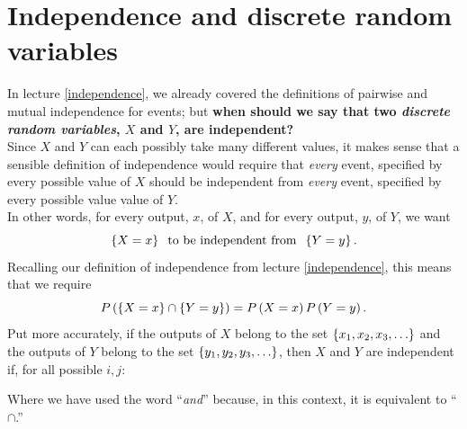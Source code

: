 \section{Independence and discrete random variables} \label{indep(discreterand)}
In lecture \ref{independence}, we already covered the definitions of pairwise and mutual independence for events; but \textbf{when should we say that two \textit{discrete random variables}, $X$ and $Y$, are independent?} \\

\noindent Since $X$ and $Y$ can each possibly take many different values, it makes sense that a sensible definition of independence would require that \textit{every} event, specified by every possible value of $X$ should be independent from \textit{every} event, specified by every possible value value of $Y$. \\

\noindent In other words, for every output, $x$, of $X$, and for every output, $y$, of $Y$, we want
\[
\left\{X = x\right\} \;\; \text{to be independent from} \;\; \left\{Y = y\right\}.
\]
Recalling our definition of independence from lecture \ref{independence}, this means that we require
\[
P\left(\left\{X = x\right\} \cap \left\{Y = y\right\}\right) = P\left(X = x\right)P\left(Y = y\right).
\]
Put more accurately, if the outputs of $X$ belong to the set $\left\{x_1, x_2, x_3, \ldots\right\}$ and the outputs of $Y$ belong to the set $\left\{y_1, y_2, y_3, \ldots\right\}$, then $X$ and $Y$ are independent if, for all possible $i,j$:

  	\bigskip
	
	\hfil{}
	\bigskip
	\bigskip
	
\noindent Where we have used the word ``\textit{and}'' because, in this context, it is equivalent to ``$\cap$.'' 

